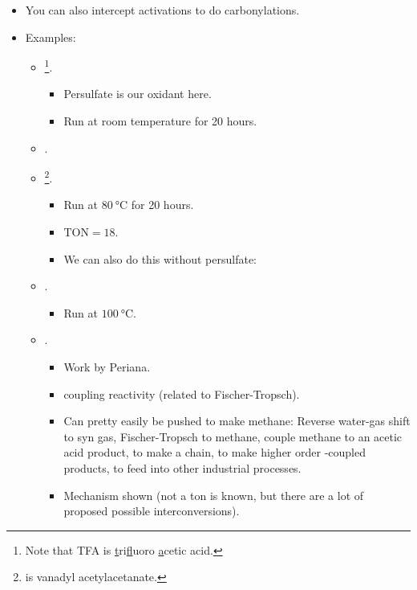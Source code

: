 \documentclass[../notes.tex]{subfiles}
\begin{document}
\begin{itemize}
\begin{itemize}
\begin{itemize}
        \end{itemize}
    \end{itemize}
    \item You can also intercept  activations to do carbonylations.
    \item Examples:
    \begin{itemize}
        \item {}\footnote{Note that TFA is \underline{t}ri\underline{f}luoro \underline{a}cetic acid.}.
        \begin{itemize}
            \item Persulfate is our oxidant here.
            \item Run at room temperature for 20 hours.
        \end{itemize}
        \item {}.
        \item {}\footnote{ is vanadyl acetylacetanate.}.
        \begin{itemize}
            \item Run at $\SI{80}{\celsius}$ for 20 hours.
            \item $\text{TON}=18$.
            \item We can also do this without persulfate:
        \end{itemize}
        \item {}.
        \begin{itemize}
            \item Run at $\SI{100}{\celsius}$.
        \end{itemize}
        \item {}.
        \begin{itemize}
            \item Work by Periana.
            \item {} coupling reactivity (related to Fischer-Tropsch).
            \item Can pretty easily be pushed to make methane: Reverse water-gas shift to syn gas, Fischer-Tropsch to methane, couple methane to an acetic acid product, to make a chain, to make higher order -coupled products, to feed into other industrial processes.
            \item Mechanism shown (not a ton is known, but there are a lot of proposed possible interconversions).

\end{itemize}
\end{itemize}
\end{itemize}
\end{document}
